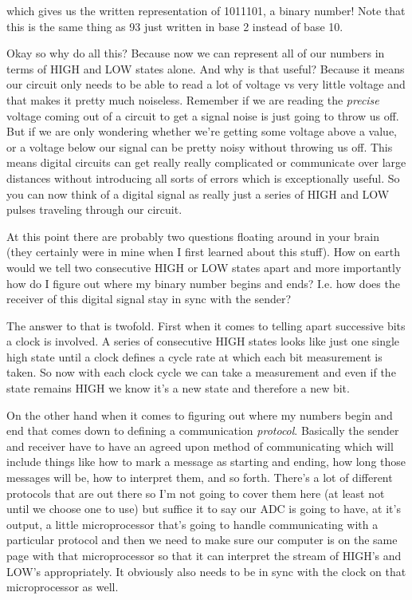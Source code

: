 \documentclass[12pt,a6paper]{book}
\begin{document}
which gives us the written representation of 1011101, a binary number! Note that this is the same thing as 93 just written in base 2 instead of base 10. 

Okay so why do all this? Because now we can represent all of our numbers in terms of HIGH and LOW states alone. And why is that useful? Because it means our circuit only needs to be able to read a lot of voltage vs very little voltage and that makes it pretty much noiseless. Remember if we are reading the \textit{precise} voltage coming out of a circuit to get a signal noise is just going to throw us off. But if we are only wondering whether we're getting some voltage above a value, or a voltage below our signal can be pretty noisy without throwing us off. This means digital circuits can get really really complicated or communicate over large distances without introducing all sorts of errors which is exceptionally useful. So you can now think of a digital signal as really just a series of HIGH and LOW pulses traveling through our circuit.

At this point there are probably two questions floating around in your brain (they certainly were in mine when I first learned about this stuff). How on earth would we tell two consecutive HIGH or LOW states apart and more importantly how do I figure out where my binary number begins and ends? I.e. how does the receiver of this digital signal stay in sync with the sender? 

The answer to that is twofold. First when it comes to telling apart successive bits a clock is involved. A series of consecutive HIGH states looks like just one single high state until a clock defines a cycle rate at which each bit measurement is taken. So now with each clock cycle we can take a measurement and even if the state remains HIGH we know it's a new state and therefore a new bit. 

On the other hand when it comes to figuring out where my numbers begin and end that comes down to defining a communication \textit{protocol}. Basically the sender and receiver have to have an agreed upon method of communicating which will include things like how to mark a message as starting and ending, how long those messages will be, how to interpret them, and so forth. There's a lot of different protocols that are out there so I'm not going to cover them here (at least not until we choose one to use) but suffice it to say our ADC is going to have, at it's output, a little microprocessor that's going to handle communicating with a particular protocol and then we need to make sure our computer is on the same page with that microprocessor so that it can interpret the stream of HIGH's and LOW's appropriately. It obviously also needs to be in sync with the clock on that microprocessor as well. 
\end{document}
